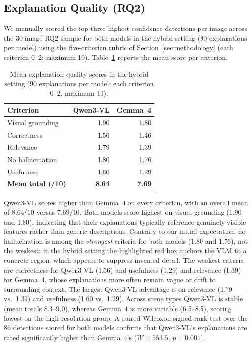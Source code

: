 \documentclass[acmtog, authorversion]{acmart}
\begin{document}
\subsection{Explanation Quality (RQ2)}

We manually scored the top three highest-confidence detections per
image across the 30-image RQ2 sample for both models in the hybrid
setting (90 explanations per model) using the five-criterion rubric of
Section~\ref{sec:methodology} (each criterion 0--2; maximum 10).
Table~\ref{tab:rq2} reports the mean score per criterion.

\begin{table}[H]
\caption{Mean explanation-quality scores in the hybrid setting
  (90 explanations per model; each criterion 0--2, maximum 10).}
\label{tab:rq2}
\begin{tabular}{lrr}
\toprule
Criterion         & Qwen3-VL & Gemma~4 \\
\midrule
Visual grounding  & 1.90 & 1.80 \\
Correctness       & 1.56 & 1.46 \\
Relevance         & 1.79 & 1.39 \\
No hallucination  & 1.80 & 1.76 \\
Usefulness        & 1.60 & 1.29 \\
\midrule
\textbf{Mean total (/10)} & \textbf{8.64} & \textbf{7.69} \\
\bottomrule
\end{tabular}
\end{table}

Qwen3-VL scores higher than Gemma~4 on every criterion, with an overall
mean of 8.64/10 versus 7.69/10. Both models score highest on visual
grounding (1.90 and 1.80), indicating that their explanations typically
reference genuinely visible features rather than generic descriptions.
Contrary to our initial expectation, no-hallucination is among the
\emph{strongest} criteria for both models (1.80 and 1.76), not the
weakest: in the hybrid setting the highlighted red box anchors the VLM
to a concrete region, which appears to suppress invented detail. The
weakest criteria are correctness for Qwen3-VL (1.56) and usefulness
(1.29) and relevance (1.39) for Gemma~4, whose explanations more often
remain vague or drift to surrounding context. The largest Qwen3-VL
advantage is on relevance (1.79 vs.\ 1.39) and usefulness (1.60 vs.\
1.29). Across scene types Qwen3-VL is stable (mean totals
8.3--9.0), whereas Gemma~4 is more variable (6.5--8.5), scoring lowest
on the high-resolution group. A paired Wilcoxon signed-rank test over
the 86 detections scored for both models confirms that Qwen3-VL's
explanations are rated significantly higher than Gemma~4's
($W = 553.5$, $p = 0.001$).
\end{document}
